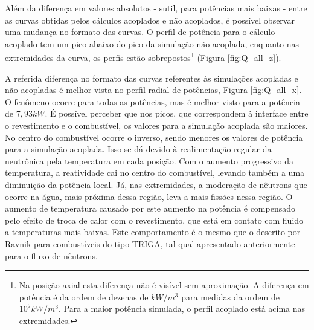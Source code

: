Além da diferença em valores absolutos - sutil, para potências mais baixas - entre as curvas obtidas pelos
cálculos acoplados e não acoplados, é possível observar uma mudança no formato das curvas. O perfil de
potência para o cálculo acoplado tem um pico abaixo do pico da simulação
não acoplada, enquanto nas extremidades da curva, os perfis estão sobrepostos\footnote{Na posição
  axial esta diferença não é visível sem aproximação. A diferença em potência é da ordem de dezenas de $kW/m^3$ para medidas da
  ordem de $10^7 kW/m^3$. Para a maior potência simulada, o perfil acoplado está acima nas extremidades.} (Figura \ref{fig:Q_all_z}).

A referida diferença no formato das curvas referentes às simulações acopladas e não acopladas é melhor vista no
perfil radial de potências, Figura \ref{fig:Q_all_x}. O fenômeno ocorre para todas as potências, mas é melhor
visto para a potência de $7,93 kW$. É possível perceber que nos picos, que correspondem à interface entre o
revestimento e o combustível, os valores para a simulação acoplada são maiores. No centro do combustível
ocorre o inverso, sendo menores os valores de potência para a simulação acoplada. Isso se dá devido à realimentação
regular da neutrônica pela temperatura em cada posição. Com o aumento progressivo da temperatura, a reatividade
cai no centro do combustível, levando também a uma diminuição da potência local. Já, nas extremidades, a moderação
de nêutrons que ocorre na água, mais próxima dessa região, leva a mais fissões nessa região. O aumento de temperatura
causado por este aumento na potência é compensado pelo efeito de troca de calor com o revestimento, que está em contato com fluido
a temperaturas mais baixas. Este comportamento é o mesmo que o descrito por Ravnik \cite{Ravnik1990}
para combustíveis do tipo TRIGA, tal qual apresentado anteriormente para o fluxo de nêutrons.

